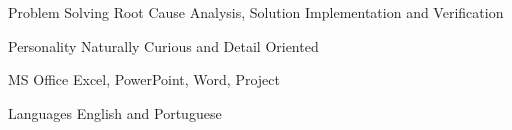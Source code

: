 


\begin{cvskills}


\cvskill
{Problem Solving} %
{Root Cause Analysis, Solution Implementation and Verification} %


\cvskill
{Personality} %
{Naturally Curious and Detail Oriented} %


\cvskill
{MS Office} %
{Excel, PowerPoint, Word, Project} %


\cvskill
{Languages} %
{English and Portuguese} %


\end{cvskills}